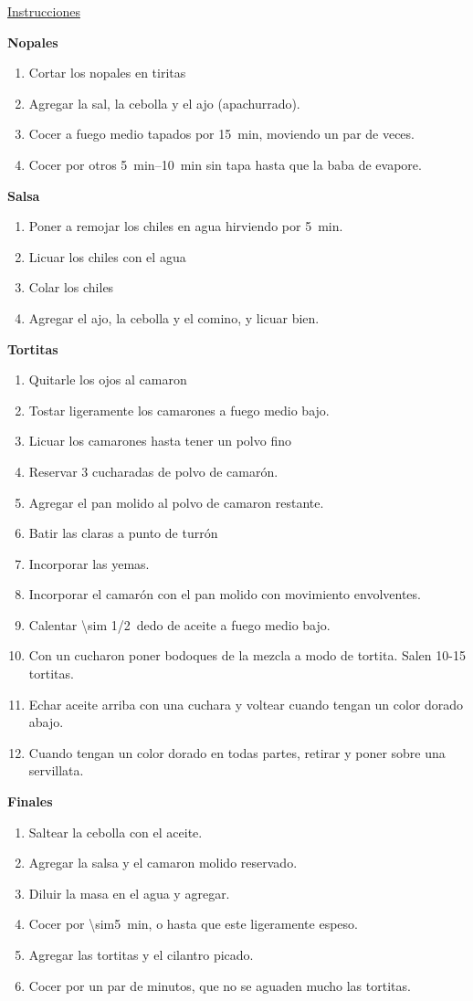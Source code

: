 \underline{Instrucciones}

\textbf{Nopales}
\begin{enumerate}
\item Cortar los nopales en tiritas
\item Agregar la sal, la cebolla y el ajo (apachurrado).
\item Cocer a fuego medio tapados por \SI{15}{min}, moviendo un par de veces.
\item Cocer por otros \SIrange{5}{10}{min} sin tapa hasta que la baba de evapore.
\end{enumerate}

\textbf{Salsa}
\begin{enumerate}
\item Poner a remojar los chiles en agua hirviendo por \SI{5}{min}.
\item Licuar los chiles con el agua
\item Colar los chiles
\item Agregar el ajo, la cebolla y el comino, y licuar bien.
\end{enumerate}

\textbf{Tortitas}
\begin{enumerate}
\item Quitarle los ojos al camaron
\item Tostar ligeramente los camarones a fuego medio bajo.
\item Licuar los camarones hasta tener un polvo fino
\item Reservar 3 cucharadas de polvo de camarón.
\item Agregar el pan molido al polvo de camaron restante.
\item Batir las claras a punto de turrón
\item Incorporar las yemas.
\item Incorporar el camarón con el pan molido con movimiento envolventes.
\item Calentar \SI{\sim 1/2}{dedo} de aceite a fuego medio bajo.
\item Con un cucharon poner bodoques de la mezcla a modo de tortita. Salen 10-15 tortitas.
\item Echar aceite arriba con una cuchara y voltear cuando tengan un color dorado abajo.
\item Cuando tengan un color dorado en todas partes, retirar y poner sobre una servillata.
\end{enumerate}

\textbf{Finales}
\begin{enumerate}
\item Saltear la cebolla con el aceite.
\item Agregar la salsa y el camaron molido reservado.
\item Diluir la masa en el agua y agregar.
\item Cocer por \SI{\sim5}{min}, o hasta que este ligeramente espeso.
\item Agregar las tortitas y el cilantro picado.
\item Cocer por un par de minutos, que no se aguaden mucho las tortitas.
\end{enumerate}
